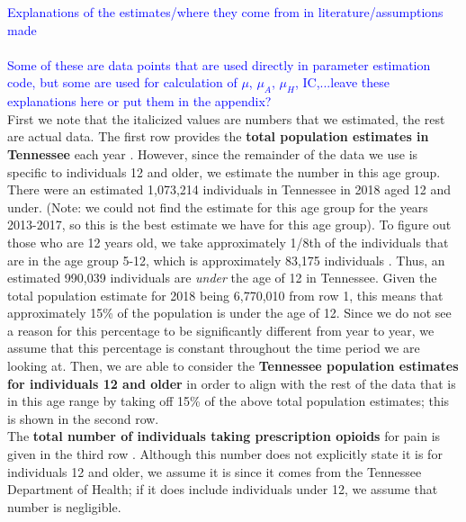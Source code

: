 \documentclass[12pt]{article}
\begin{document}
 \textcolor{blue}{Explanations of the estimates/where they come from in literature/assumptions made} \\ \\
 \textcolor{blue}{Some of these are data points that are used directly in parameter estimation code, but some are used for calculation of $\mu$, $\mu_A$, $\mu_H$, IC,...leave these explanations here or put them in the appendix?} \\
 First we note that the italicized values are numbers that we estimated, the rest are actual data. 
The first row provides the \textbf{total population estimates in Tennessee} each year \cite{USCensus}. However, since the remainder of the data we use is specific to individuals 12 and older, we estimate the number in this age group. 
There were an estimated 1,073,214 individuals in Tennessee in 2018 aged 12 and under. (Note: we could not find the estimate for this age group for the years 2013-2017, so this is the best estimate we have for this age group). To figure out those who are 12 years old, we take approximately 1/8th of the individuals that are in the age group 5-12, which is approximately 83,175 individuals \cite{DOHHS}. Thus, an estimated 990,039 individuals are \emph{under} the age of 12 in Tennessee. Given the total population estimate for 2018 being 6,770,010 from row 1, this means that approximately 15\% of the population is under the age of 12. Since we do not see a reason for this percentage to be significantly different from year to year, we assume that this percentage is constant throughout the time period we are looking at. Then, we are able to consider the \textbf{Tennessee population estimates for individuals 12 and older} in order to align with the rest of the data that is in this age range by taking off 15\% of the above total population estimates; this is shown in the second row.  \\

The \textbf{total number of individuals taking prescription opioids} for pain is given in the third row \cite{TNgov1}. Although this number does not explicitly state it is for individuals 12 and older, we assume it is since it comes from the Tennessee Department of Health; if it does include individuals under 12, we assume that number is negligible. \\
\end{document}
